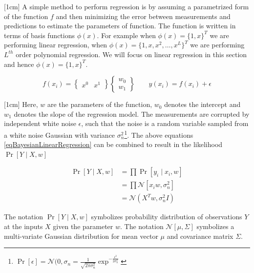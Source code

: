 [1cm]
A simple method to perform regression is by assuming a parametrized form of the function $f$ and then minimizing the error between measurements and predictions to estimate the parameters of function. The function is written in terms of basis functions $\phi(x)$. For example when $\phi(x) = \{1, x\}^{T}$ we are performing linear regression, when $\phi(x) = \{1, x, x^{2}, \ldots, x^{L}\}^{T}$ we are performing $L^{th}$ order polynomial regression. We will focus on linear regression in this section and hence $\phi(x) = \{1, x\}^{T}$.

\begin{equation}\label{eqBayesianLinearRegression}
f(x_{i}) = \begin{Bmatrix}
x^{0} & x^{1}
\end{Bmatrix}  \begin{Bmatrix}
w_{0}\\ 
w_{1}
\end{Bmatrix}
\quad \quad y(x_{i}) = f(x_{i}) + \epsilon
\end{equation}

[1cm]
Here, $w$ are the parameters of the function, $w_{0}$ denotes the intercept and $w_{1}$ denotes the slope of the regression model. The measurements are corrupted by independent white noise $\epsilon$, such that the noise is a random variable sampled from a white noise Gaussian with variance $\sigma_{n}^{2}$\footnote{$\Pr[\epsilon] = \mathcal{N}(0, \sigma_{n} = \frac{1}{\sqrt{2\pi\sigma_{n}^{2}}}\exp^{-\frac{\epsilon^{2}}{2\sigma_{n}^{2}}}
$}. The above equations \ref{eqBayesianLinearRegression} can be combined to result in the likelihood $\Pr[Y\mid X, w]$

\begin{equation}\label{eqBayesianLikelihood}
\begin{aligned}
\Pr[Y \mid X, w]  & = \prod \Pr[y_{i}\mid x_{i}, w]\\
                & = \prod \mathcal{N}[x_{i}w , \sigma_{n}^{2}]\\
                & = \mathcal{N}(X^{T} w, \sigma_{n}^{2}I)    
\end{aligned}
\end{equation}

The notation $\Pr[Y \mid X, w]$ symbolizes probability distribution of observations $Y$ at the inputs $X$ given the parameter $w$. The notation $\mathcal{N}[\mu , \Sigma]$ symbolizes a multi-variate Gaussian distribution for mean vector $\mu$ and covariance matrix $\Sigma$. 

